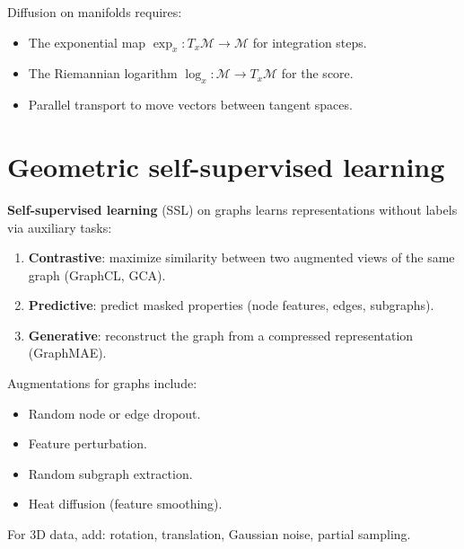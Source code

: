 \begin{attention}[title=\textbf{Technical challenges}]
Diffusion on manifolds requires:
\begin{itemize}
  \item The exponential map $\exp_x : T_x\mathcal{M} \to
        \mathcal{M}$ for integration steps.
  \item The Riemannian logarithm $\log_x : \mathcal{M} \to
        T_x\mathcal{M}$ for the score.
  \item Parallel transport to move vectors between tangent spaces.
\end{itemize}
\end{attention}

\section{Geometric self-supervised learning}
\label{sec:geometric_ssl}

\begin{definition}
\textbf{Self-supervised learning} (SSL) on graphs learns
representations without labels via auxiliary tasks:
\begin{enumerate}
  \item \textbf{Contrastive}: maximize similarity between two
        augmented views of the same graph (GraphCL, GCA).
  \item \textbf{Predictive}: predict masked properties (node
        features, edges, subgraphs).
  \item \textbf{Generative}: reconstruct the graph from a
        compressed representation (GraphMAE).
\end{enumerate}
\end{definition}

\begin{proposition}
Augmentations for graphs include:
\begin{itemize}
  \item Random node or edge dropout.
  \item Feature perturbation.
  \item Random subgraph extraction.
  \item Heat diffusion (feature smoothing).
\end{itemize}
For 3D data, add: rotation, translation, Gaussian noise, partial
sampling.
\end{proposition}

